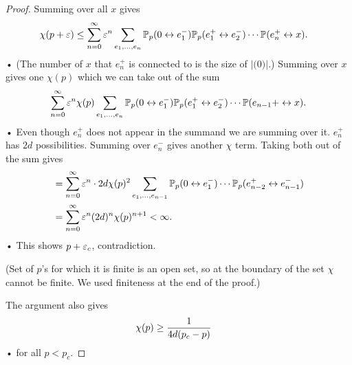 \begin{proof}
Summing over all $x$ gives
\begin{align*}
\chi(p+\varepsilon) &\le \sum_{n=0}^{\infty} \varepsilon^n \sum_{e_1,\ldots, e_n} \mathbb{P}_p(0\leftrightarrow e_1^-)\mathbb{P}_p(e_1^+\leftrightarrow e_2^-)\cdots \mathbb{P}(e_n^+\leftrightarrow x).
\end{align*}•
(The number of $x$ that $e_n^+$ is connected to is the size of $|\mathscr (0)|$.)
Summing over $x$ gives one $\chi(p)$ which we can take out of the sum
\begin{align*}
\sum_{n=0}^{\infty} \varepsilon^n \chi(p) \sum_{e_1,\ldots, e_n} \mathbb{P}_p(0\leftrightarrow e_1^-)\mathbb{P}_p(e_1^+\leftrightarrow e_2^-)\cdots \mathbb{P}(e_{n-1}+\leftrightarrow x).
\end{align*}•
Even though $e_n^+$ does not appear in the summand we are summing over it. $e_n^+$ has $2d$ possibilities. Summing over $e_n^-$ gives another $\chi$ term. Taking both out of the sum gives
\begin{align*}
&= \sum_{n=0}^{\infty} \varepsilon^n \cdot 2d\chi(p)^2 \sum_{e_1,\ldots, e_{n-1}} \mathbb{P}_p(0\leftrightarrow e_1^-)\cdots \mathbb{P}_p (e_{n-2}^+\leftrightarrow e_{n-1}^-)\\
&= \sum_{n=0}^{\infty} \varepsilon^n (2d)^n \chi(p)^{n+1}<\infty.
\end{align*}•
This shows $p+\varepsilon_c$, contradiction. 

(Set of $p$'s for which it is finite is an open set, so at the boundary of the set $\chi$ cannot be finite. We used finiteness at the end of the proof.)

The argument also gives 
\begin{align*}
\chi(p) &\ge \frac{1}{4d(p_c-p)}
\end{align*}•
for all $p<p_c$. 
\end{proof}


